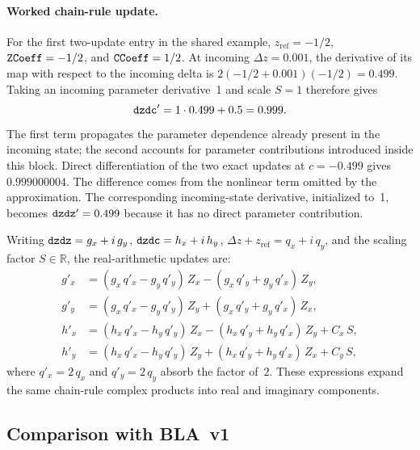 \paragraph{Worked chain-rule update.}
For the first two-update entry in the shared example,
$z_\mathrm{ref}=-1/2$, $\texttt{ZCoeff}=-1/2$, and
$\texttt{CCoeff}=1/2$. At incoming $\Delta z=0.001$, the derivative of its
map with respect to the incoming delta is
$2(-1/2+0.001)(-1/2)=0.499$. Taking an incoming parameter derivative~1
and scale $S=1$ therefore gives
\[
\texttt{dzdc}'=1\cdot0.499+0.5=0.999.
\]
The first term propagates the parameter dependence already present in the
incoming state; the second accounts for parameter contributions introduced
inside this block. Direct differentiation of the two exact updates at
$c=-0.499$ gives $0.999000004$. The difference comes from the nonlinear term
omitted by the approximation. The corresponding incoming-state derivative,
initialized to~1, becomes $\texttt{dzdz}'=0.499$ because it has no direct
parameter contribution.

Writing $\texttt{dzdz} = g_x + i\,g_y$, $\texttt{dzdc} = h_x + i\,h_y$,
$\Delta z + z_\mathrm{ref} = q_x + i\,q_y$, and the scaling factor
$S \in \mathbb{R}$, the real-arithmetic updates are:
\begin{align}
g'_x &= (g_x\,q'_x - g_y\,q'_y)\,Z_x
      - (g_x\,q'_y + g_y\,q'_x)\,Z_y, \\
g'_y &= (g_x\,q'_x - g_y\,q'_y)\,Z_y
      + (g_x\,q'_y + g_y\,q'_x)\,Z_x, \\
h'_x &= (h_x\,q'_x - h_y\,q'_y)\,Z_x
      - (h_x\,q'_y + h_y\,q'_x)\,Z_y
      + C_x\,S, \\
h'_y &= (h_x\,q'_x - h_y\,q'_y)\,Z_y
      + (h_x\,q'_y + h_y\,q'_x)\,Z_x
      + C_y\,S,
\end{align}
where $q'_x = 2\,q_x$ and $q'_y = 2\,q_y$ absorb the factor of~$2$.
These expressions expand the same chain-rule complex products into
real and imaginary components.

\subsection{Comparison with BLA~v1}
\label{sec:la-vs-bla}

